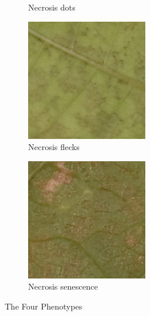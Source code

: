 \documentclass[english]{article}
\begin{document}
\begin{figure}[H]
\begin{subfigure}[b]{0.2\linewidth}
		\caption{Necrosis dots}\label{fig:necrosisdots}
	\end{subfigure}
	\begin{subfigure}[b]{0.2\linewidth}
		\includegraphics[width=\linewidth]{Exp20DM01_inoc2_T6_P47_c_4.png}
		\caption{Necrosis flecks}\label{fig:necrosisstains}
	\end{subfigure}
	\begin{subfigure}[b]{0.2\linewidth}
		\includegraphics[width=\linewidth]{Exp21DM01_inoc1_T6_P27_b_2.png}
		\caption{Necrosis senescence}\label{fig:necrosissenescence}
	\end{subfigure}
	\caption{The Four Phenotypes}\label{fig:phenotypes}
\end{figure}
\end{document}
